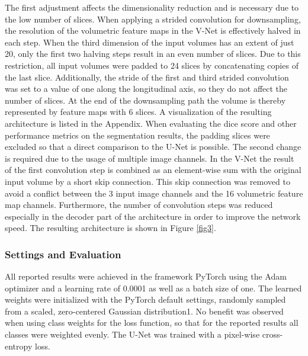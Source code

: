 \documentclass[10pt,letterpaper]{article}
\begin{document}
	The first adjustment affects the dimensionality reduction and is necessary due to the low number of slices. When applying a strided convolution for downsampling, the resolution of the volumetric feature maps in the V-Net is effectively halved in each step. When the third dimension of the input volumes has an extent of just 20, only the first two halving steps result in an even number of slices. Due to this restriction, all input volumes were padded to 24 slices by concatenating copies of the last slice. Additionally, the stride of the first and third strided convolution was set to a value of one along the longitudinal axis, so they do not affect the number of slices. At the end of the downsampling path the volume is thereby represented by feature maps with 6 slices. A visualization of the resulting architecture is listed in the Appendix. When evaluating the dice score and other performance metrics on the segmentation results, the padding slices were excluded so that a direct comparison to the U-Net is possible. The second change is required due to the usage of multiple image channels. In the V-Net the result of the first convolution step is combined as an element-wise sum with the original input volume by a short skip connection. This skip connection was removed to avoid a conflict between the 3 input image channels and the 16 volumetric feature map channels. Furthermore, the number of convolution steps was reduced especially in the decoder part of the architecture in order to improve the network speed. The resulting architecture is shown in Figure \ref{fig3}.





	\subsubsection*{Settings and Evaluation}
	All reported results were achieved in the framework PyTorch using the Adam optimizer \cite{kingma2014adam} and a learning rate of 0.0001 as well as a batch size of one. The learned weights were initialized with the PyTorch default settings, randomly sampled from a scaled, zero-centered Gaussian distribution1. No benefit was observed when using class weights for the loss function, so that for the reported results all classes were weighted evenly. The U-Net was trained with a pixel-wise cross-entropy loss. \\
\end{document}
